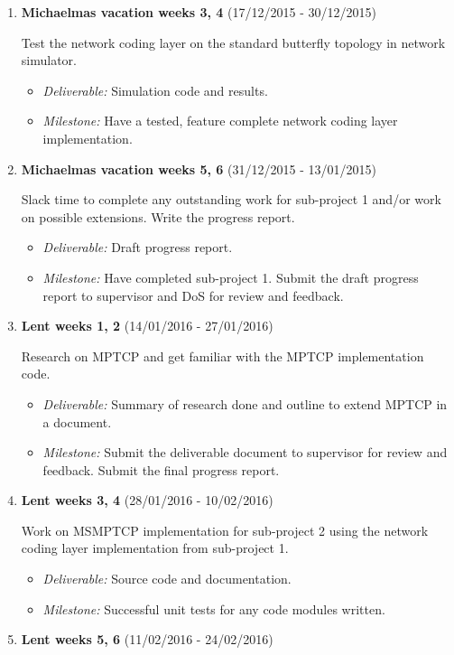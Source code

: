 \documentclass[12pt,a4paper,twoside]{article}
\begin{document}
\begin{enumerate}
\item {\bf Michaelmas vacation weeks 3, 4} (17/12/2015 - 30/12/2015)

Test the network coding layer on the standard butterfly topology in network simulator.
\begin{itemize}
  \item {\em Deliverable:} Simulation code and results.
  \item {\em Milestone:} Have a tested, feature complete network coding layer implementation.
\end{itemize}

\item {\bf Michaelmas vacation weeks 5, 6} (31/12/2015 - 13/01/2015)

Slack time to complete any outstanding work for sub-project 1 and/or work on possible extensions.
Write the progress report. 
\begin{itemize}
  \item {\em Deliverable:} Draft progress report.
  \item {\em Milestone:} Have completed sub-project 1. Submit the draft progress report to supervisor and DoS for review and feedback.
\end{itemize}

\item {\bf Lent weeks 1, 2} (14/01/2016 - 27/01/2016)

Research on MPTCP and get familiar with the MPTCP implementation code.
\begin{itemize}
  \item {\em Deliverable:} Summary of research done and outline to extend MPTCP in a document.
  \item {\em Milestone:} Submit the deliverable document to supervisor for review and feedback. Submit the final progress report.
\end{itemize}

\item {\bf Lent weeks 3, 4} (28/01/2016 - 10/02/2016)

Work on MSMPTCP implementation for sub-project 2 using the network coding layer implementation from sub-project 1.
\begin{itemize}
  \item {\em Deliverable:} Source code and documentation.
  \item {\em Milestone:} Successful unit tests for any code modules written.
\end{itemize}

\item {\bf Lent weeks 5, 6} (11/02/2016 - 24/02/2016)


\end{enumerate}
\end{document}
